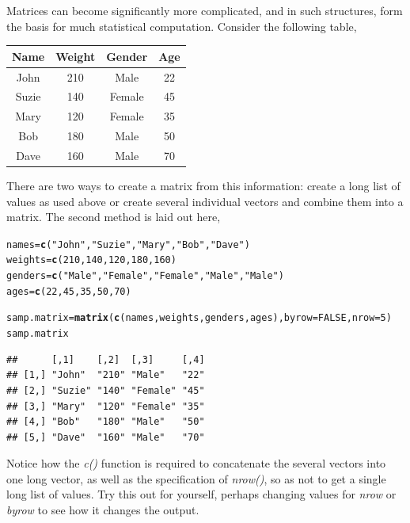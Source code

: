 \documentclass{report}\usepackage[]{graphicx}\usepackage[]{color}
\makeatletter
\newcommand{\hlnum}[1]{\textcolor[rgb]{0.686,0.059,0.569}{#1}}%
\newcommand{\hlstr}[1]{\textcolor[rgb]{0.192,0.494,0.8}{#1}}%
\newcommand{\hlstd}[1]{\textcolor[rgb]{0.345,0.345,0.345}{#1}}%
\newcommand{\hlkwb}[1]{\textcolor[rgb]{0.69,0.353,0.396}{#1}}%
\newcommand{\hlkwc}[1]{\textcolor[rgb]{0.333,0.667,0.333}{#1}}%
\newcommand{\hlkwd}[1]{\textcolor[rgb]{0.737,0.353,0.396}{\textbf{#1}}}%
\newenvironment{kframe}{%
 \def\at@end@of@kframe{}%
 \ifinner\ifhmode%
  \def\at@end@of@kframe{\end{minipage}}%
  \begin{minipage}{\columnwidth}%
 \fi\fi%
 \def\FrameCommand##1{\hskip\@totalleftmargin \hskip-\fboxsep
 \colorbox{shadecolor}{##1}\hskip-\fboxsep
     \hskip-\linewidth \hskip-\@totalleftmargin \hskip\columnwidth}%
 \MakeFramed {\advance\hsize-\width
   \@totalleftmargin\z@ \linewidth\hsize
   \@setminipage}}%
 {\par\unskip\endMakeFramed%
 \at@end@of@kframe}
\newenvironment{knitrout}{}{} %
\makeatother
\begin{document}
Matrices can become significantly more complicated, and in such structures, form the basis for much statistical computation.  Consider the following table,

\begin{center} 
\begin{tabular}{|c c c c|}
\hline 
Name & Weight & Gender & Age \\ 
\hline 
John & 210 & Male & 22 \\ 
Suzie & 140 & Female & 45 \\ 
Mary & 120 & Female & 35 \\ 
Bob & 180 & Male & 50 \\ 
Dave & 160 & Male & 70 \\ 
\hline 
\end{tabular} 
\end{center}

There are two ways to create a matrix from this information: create a long list of values as used above or create several individual vectors and combine them into a matrix.  The second method is laid out here, 
\begin{knitrout}
\color{fgcolor}\begin{kframe}
\begin{alltt}
\hlstd{names}  \hlkwb{=} \hlkwd{c}\hlstd{(}\hlstr{"John"}\hlstd{,} \hlstr{"Suzie"}\hlstd{,} \hlstr{"Mary"}\hlstd{,} \hlstr{"Bob"}\hlstd{,} \hlstr{"Dave"}\hlstd{)}
\hlstd{weights} \hlkwb{=} \hlkwd{c}\hlstd{(}\hlnum{210}\hlstd{,} \hlnum{140}\hlstd{,} \hlnum{120}\hlstd{,} \hlnum{180}\hlstd{,} \hlnum{160}\hlstd{)}
\hlstd{genders} \hlkwb{=} \hlkwd{c}\hlstd{(}\hlstr{"Male"}\hlstd{,} \hlstr{"Female"}\hlstd{,} \hlstr{"Female"}\hlstd{,} \hlstr{"Male"}\hlstd{,} \hlstr{"Male"}\hlstd{)}
\hlstd{ages} \hlkwb{=} \hlkwd{c}\hlstd{(}\hlnum{22}\hlstd{,} \hlnum{45}\hlstd{,} \hlnum{35}\hlstd{,} \hlnum{50}\hlstd{,} \hlnum{70}\hlstd{)}

\hlstd{samp.matrix} \hlkwb{=} \hlkwd{matrix}\hlstd{(}\hlkwd{c}\hlstd{(names, weights, genders, ages),} \hlkwc{byrow} \hlstd{=} \hlnum{FALSE}\hlstd{,} \hlkwc{nrow} \hlstd{=} \hlnum{5}\hlstd{)}
\hlstd{samp.matrix}
\end{alltt}
\begin{verbatim}
##      [,1]    [,2]  [,3]     [,4]
## [1,] "John"  "210" "Male"   "22"
## [2,] "Suzie" "140" "Female" "45"
## [3,] "Mary"  "120" "Female" "35"
## [4,] "Bob"   "180" "Male"   "50"
## [5,] "Dave"  "160" "Male"   "70"
\end{verbatim}
\end{kframe}
\end{knitrout}
Notice how the \textit{c()} function is required to concatenate the several vectors into one long vector, as well as the specification of \textit{nrow()}, so as not to get a single long list of values. Try this out for yourself, perhaps changing values for \textit{nrow} or \textit{byrow} to see how it changes the output.   
\end{document}
